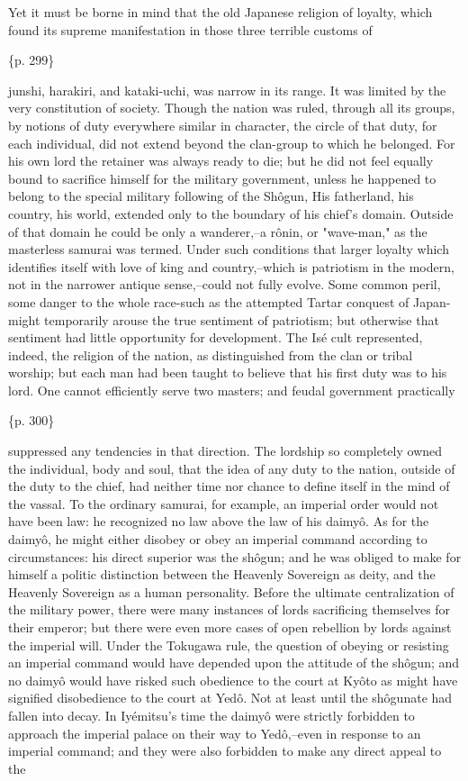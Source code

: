 Yet it must be borne in mind that the old Japanese religion of loyalty, which found its supreme manifestation in those three terrible customs of

\{p. 299\}

junshi, harakiri, and kataki-uchi, was narrow in its range. It was limited by the very constitution of society. Though the nation was ruled, through all its groups, by notions of duty everywhere similar in character, the circle of that duty, for each individual, did not extend beyond the clan-group to which he belonged. For his own lord the retainer was always ready to die; but he did not feel equally bound to sacrifice himself for the military government, unless he happened to belong to the special military following of the Shôgun, His fatherland, his country, his world, extended only to the boundary of his chief's domain. Outside of that domain he could be only a wanderer,--a rônin, or "wave-man," as the masterless samurai was termed. Under such conditions that larger loyalty which identifies itself with love of king and country,--which is patriotism in the modern, not in the narrower antique sense,--could not fully evolve. Some common peril, some danger to the whole race-such as the attempted Tartar conquest of Japan-might temporarily arouse the true sentiment of patriotism; but otherwise that sentiment had little opportunity for development. The Isé cult represented, indeed, the religion of the nation, as distinguished from the clan or tribal worship; but each man had been taught to believe that his first duty was to his lord. One cannot efficiently serve two masters; and feudal government practically

\{p. 300\}

suppressed any tendencies in that direction. The lordship so completely owned the individual, body and soul, that the idea of any duty to the nation, outside of the duty to the chief, had neither time nor chance to define itself in the mind of the vassal. To the ordinary samurai, for example, an imperial order would not have been law: he recognized no law above the law of his daimyô. As for the daimyô, he might either disobey or obey an imperial command according to circumstances: his direct superior was the shôgun; and he was obliged to make for himself a politic distinction between the Heavenly Sovereign as deity, and the Heavenly Sovereign as a human personality. Before the ultimate centralization of the military power, there were many instances of lords sacrificing themselves for their emperor; but there were even more cases of open rebellion by lords against the imperial will. Under the Tokugawa rule, the question of obeying or resisting an imperial command would have depended upon the attitude of the shôgun; and no daimyô would have risked such obedience to the court at Kyôto as might have signified disobedience to the court at Yedô. Not at least until the shôgunate had fallen into decay. In Iyémitsu's time the daimyô were strictly forbidden to approach the imperial palace on their way to Yedô,--even in response to an imperial command; and they were also forbidden to make any direct appeal to the


